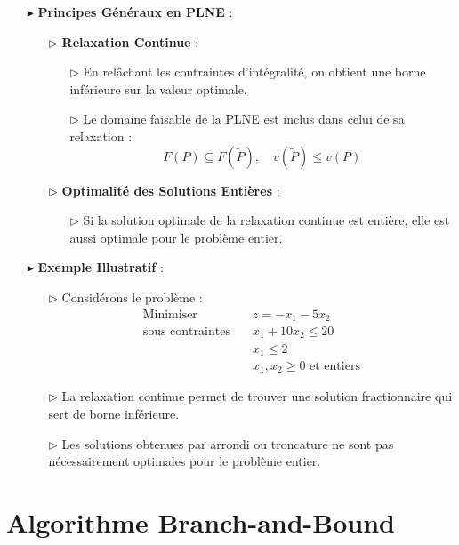 \documentclass{report}
\begin{document}
\begin{multicols*}{2}
\begin{itemize}
    \item[$\blacktriangleright$] \textbf{Principes Généraux en PLNE} :
    \begin{enumerate}
        \item[$\rhd$] \textbf{Relaxation Continue} :
        \begin{itemize}
            \item[$\rhd$] En relâchant les contraintes d'intégralité, on obtient une borne inférieure sur la valeur optimale.
            \item[$\rhd$] Le domaine faisable de la PLNE est inclus dans celui de sa relaxation :
            \[
            F(P) \subseteq F(\tilde{P}), \quad v(\tilde{P}) \leq v(P)
            \]
        \end{itemize}
        \item[$\rhd$] \textbf{Optimalité des Solutions Entières} :
        \begin{itemize}
            \item[$\rhd$] Si la solution optimale de la relaxation continue est entière, elle est aussi optimale pour le problème entier.
        \end{itemize}
    \end{enumerate}

    \item[$\blacktriangleright$] \textbf{Exemple Illustratif} :
    \begin{itemize}
        \item[$\rhd$] Considérons le problème :
        \[
        \begin{aligned}
        \text{Minimiser} & \quad z = -x_1 - 5x_2 \\
        \text{sous contraintes} & \quad x_1 + 10x_2 \leq 20 \\
        & \quad x_1 \leq 2 \\
        & \quad x_1, x_2 \geq 0 \text{ et entiers}
        \end{aligned}
        \]
        \item[$\rhd$] La relaxation continue permet de trouver une solution fractionnaire qui sert de borne inférieure.
        \item[$\rhd$] Les solutions obtenues par arrondi ou troncature ne sont pas nécessairement optimales pour le problème entier.
    \end{itemize}
\end{itemize}

\section*{Algorithme Branch-and-Bound}


\end{multicols*}
\end{document}

